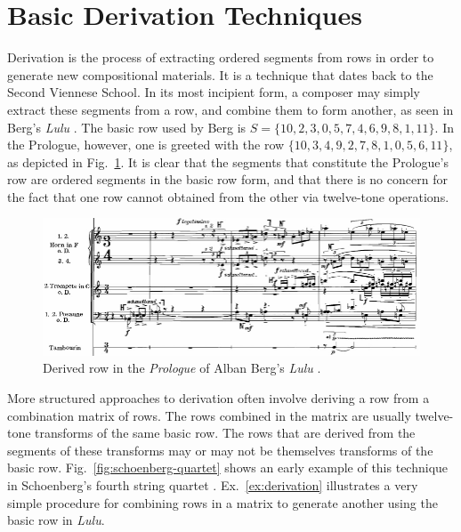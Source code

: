 \section{Basic Derivation Techniques}

Derivation is the process of extracting ordered segments from rows in order to generate new compositional materials. It is a technique that dates back to the Second Viennese School. In its most incipient form, a composer may simply extract these segments from a row, and combine them to form another, as seen in Berg's \emph{Lulu} \cite[182]{Starr1984}. The basic row used by Berg is $S = \{ 10, 2, 3, 0, 5, 7, 4, 6, 9, 8, 1, 11 \}$. In the Prologue, however, one is greeted with the row $\{ 10, 3, 4, 9, 2, 7, 8, 1, 0, 5, 6, 11 \}$, as depicted in Fig.~\ref{fig:berg-prologue}. It is clear that the segments that constitute the Prologue's row are ordered segments in the basic row form, and that there is no concern for the fact that one row cannot obtained from the other via twelve-tone operations.

\begin{figure}[htbp]
    \centering
	\includegraphics[width=6.5in]{figures/berg2.png}
	\caption[Derived Row in Berg's \emph{Lulu}]{Derived row in the \emph{Prologue} of Alban Berg's \emph{Lulu} \cite[182]{Starr1984}.}
	\label{fig:berg-prologue}
\end{figure}

More structured approaches to derivation often involve deriving a row from a combination matrix of rows. The rows combined in the matrix are usually twelve-tone transforms of the same basic row. The rows that are derived from the segments of these transforms may or may not be themselves transforms of the basic row. Fig.~\ref{fig:schoenberg-quartet} shows an early example of this technique in Schoenberg's fourth string quartet \cite[100]{Westergaard1966}. Ex.~\ref{ex:derivation} illustrates a very simple procedure for combining rows in a matrix to generate another using the basic row in \emph{Lulu}. %

